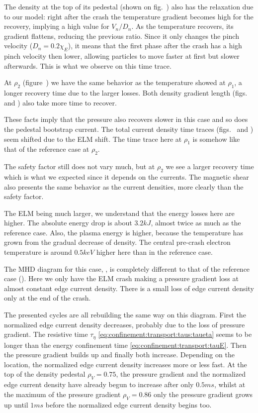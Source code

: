 The density at the top of its pedestal (shown on fig.~) also has the relaxation due to our model: right after the crash the temperature gradient becomes high for the recovery, implying a high value for $V_n / D_n$. As the temperature recovers, its gradient flattens, reducing the previous ratio. Since it only changes the pinch velocity ($D_n = 0.2 \chi_E$), it means that the first phase after the crash has a high pinch velocity then lower, allowing particles to move faster at first but slower afterwards. This is what we observe on this time trace.

At $\rho_2$ (figure~) we have the same behavior as the temperature showed at $\rho_1$, a longer recovery time due to the larger losses. Both density gradient length (figs.~ and ) also take more time to recover.

These facts imply that the pressure also recovers slower in this case and so does the pedestal bootstrap current. The total current density time traces (figs.~ and ) seem shifted due to the ELM shift. The time trace here at $\rho_1$ is somehow like that of the reference case at $\rho_2$.

The safety factor still does not vary much, but at $\rho_2$ we see a larger recovery time which is what we expected since it depends on the currents. The magnetic shear also presents the same behavior as the current densities, more clearly than the safety factor.

The ELM being much larger, we understand that the energy losses here are higher. The absolute energy drop is about $3.2 kJ$, almost twice as much as the reference case. Also, the plasma energy is higher, because the temperature has grown from the gradual decrease of density. The central pre-crash electron temperature is around $0.5 keV$ higher here than in the reference case.

The MHD diagram for this case, , is completely different to that of the reference case (). Here we only have the ELM crash making a pressure gradient loss at almost constant edge current density. There is a small loss of edge current density only at the end of the crash.

The presented cycles are all rebuilding the same way on this diagram. First the normalized edge current density decreases, probably due to the loss of pressure gradient. The resistive time $\tau_{\eta}$ \eqref{eq:confinement:transport:taus:taueta} seems to be longer than the energy confinement time \eqref{eq:confinement:transport:tauE}. Then the pressure gradient builds up and finally both increase. Depending on the location, the normalized edge current density increases more or less fast. At the top of the density pedestal $\rho_V = 0.75$, the pressure gradient and the normalized edge current density have already begun to increase after only $0.5ms$, whilst at the maximum of the pressure gradient $\rho_V = 0.86$ only the pressure gradient grows up until $1ms$ before the normalized edge current density begins too.


